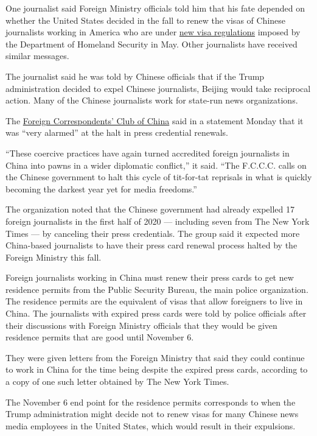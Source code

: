One journalist said Foreign Ministry officials told him that his fate
depended on whether the United States decided in the fall to renew the
visas of Chinese journalists working in America who are under
\href{https://www.nytimes3xbfgragh.onion/2020/05/09/us/politics/china-journalists-us-visa-crackdown.html}{new
visa regulations} imposed by the Department of Homeland Security in May.
Other journalists have received similar messages.

The journalist said he was told by Chinese officials that if the Trump
administration decided to expel Chinese journalists, Beijing would take
reciprocal action. Many of the Chinese journalists work for state-run
news organizations.

The \href{https://fccchina.org/about/}{Foreign Correspondents' Club of
China} said in a statement Monday that it was ``very alarmed'' at the
halt in press credential renewals.

``These coercive practices have again turned accredited foreign
journalists in China into pawns in a wider diplomatic conflict,'' it
said. ``The F.C.C.C. calls on the Chinese government to halt this cycle
of tit-for-tat reprisals in what is quickly becoming the darkest year
yet for media freedoms.''

The organization noted that the Chinese government had already expelled
17 foreign journalists in the first half of 2020 --- including seven
from The New York Times --- by canceling their press credentials. The
group said it expected more China-based journalists to have their press
card renewal process halted by the Foreign Ministry this fall.

Foreign journalists working in China must renew their press cards to get
new residence permits from the Public Security Bureau, the main police
organization. The residence permits are the equivalent of visas that
allow foreigners to live in China. The journalists with expired press
cards were told by police officials after their discussions with Foreign
Ministry officials that they would be given residence permits that are
good until November 6.

They were given letters from the Foreign Ministry that said they could
continue to work in China for the time being despite the expired press
cards, according to a copy of one such letter obtained by The New York
Times.

The November 6 end point for the residence permits corresponds to when
the Trump administration might decide not to renew visas for many
Chinese news media employees in the United States, which would result in
their expulsions.

